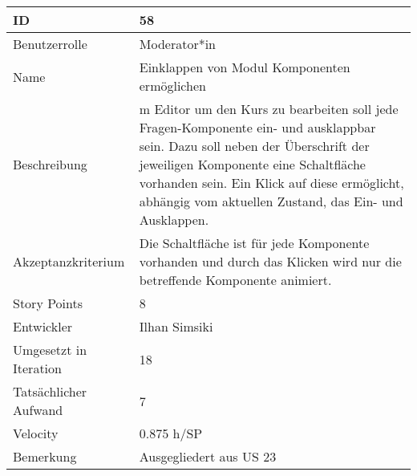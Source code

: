\begin{tabularx}{\textwidth}{|p{}|X|}
	\hline
	ID & 58\\
	\hline
	Benutzerrolle & Moderator*in\\
	\hline
	Name & Einklappen von Modul Komponenten ermöglichen\\
	\hline
	Beschreibung & m Editor um den Kurs zu bearbeiten soll jede Fragen-Komponente ein- und ausklappbar sein.
		Dazu soll neben der Überschrift der jeweiligen Komponente eine Schaltfläche vorhanden sein.
		Ein Klick auf diese ermöglicht, abhängig vom aktuellen Zustand, das Ein- und Ausklappen.\\
	\hline
	Akzeptanzkriterium & Die Schaltfläche ist für jede Komponente vorhanden und durch das Klicken wird nur die betreffende Komponente animiert.\\
	\hline
	Story Points & 8\\
	\hline
	Entwickler & Ilhan Simsiki\\
	\hline
	Umgesetzt in Iteration & 18\\
	\hline
	Tatsächlicher Aufwand & 7\\
	\hline
	Velocity & 0.875 h/SP\\
	\hline
	Bemerkung & Ausgegliedert aus US 23\\
	\hline
\end{tabularx}
\vspace{20pt}
